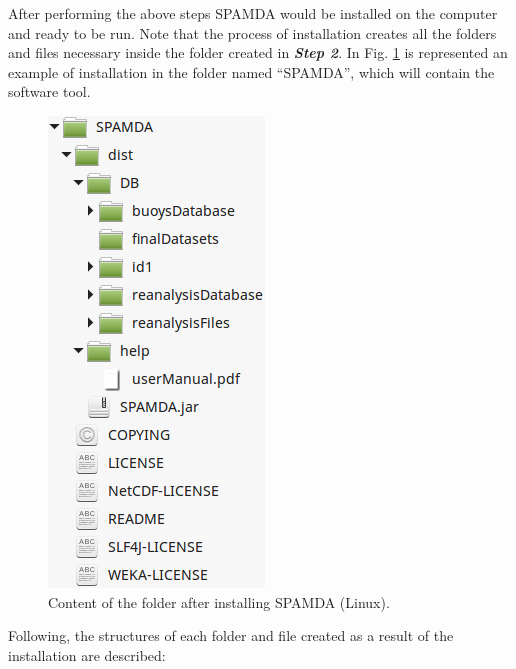 \begin{onehalfspace}
				After performing the above steps SPAMDA would be installed on the computer and ready to be run. Note that the process of installation creates all the folders and files necessary inside the folder created in \textit{\textbf{Step 2}}. In Fig. \ref{fig:installationOnLinux} is represented an example of installation in the folder named ``SPAMDA'', which will contain the software tool.
				
				\begin{figure}[ht!]
					\centering
					\includegraphics[scale=0.40]{figures/installationOnLinux.png}
					\caption{Content of the folder after installing SPAMDA (Linux).}
					\label{fig:installationOnLinux}
				\end{figure}
				
				Following, the structures of each folder and file created as a result of the installation are described:
				

\end{onehalfspace}
